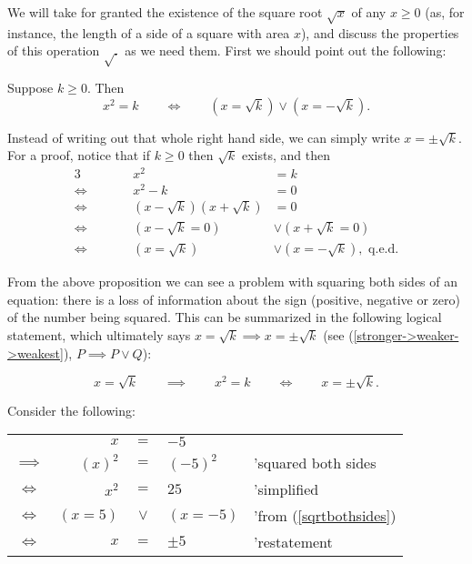 We will take for granted
the existence of the square root $\sqrt{x}$ of any $x\ge0$ (as,
for instance, the length of a side of a square with area $x$), 
and discuss
the properties of this operation $\sqrt{.}$ as we need them.
First we should point out the following:
\begin{principle}
Suppose $k\ge0$.  Then
\begin{equation} x^2=k\qquad \iff\qquad \left(x=\sqrt{k}\right)
\vee\left(x=-\sqrt{k}\right).\end{equation}
\end{principle}
Instead of writing out that whole right hand side, we can 
simply write $x=\pm\sqrt{k}$.  
For a proof, notice that if $k\ge0$ then $\sqrt{k}$ exists, and then
\begin{alignat*}{3}
&&x^2&=k\\
\iff&\qquad&x^2-k&=0\\
\iff&&\left(x-\sqrt{k}\right)\left(x+\sqrt{k}\right)&=0\\
\iff&&\left(x-\sqrt{k}=0\right)&\vee\left(x+\sqrt{k}=0\right)\\
\iff&&\left(x=\sqrt{k}\right)&\vee\left(x=-\sqrt{k}\right),
\text{ q.e.d.}
\end{alignat*}



From the above proposition we can 
see a problem with squaring both sides
of an equation: there is a loss of information about the sign
(positive, negative or zero)
of the number being squared.  This can be summarized in the
following logical statement, which 
ultimately says $x=\sqrt{k}\implies x=\pm\sqrt{k}$
(see (\ref{stronger->weaker->weakest}), $P\implies P\vee Q$):

\begin{equation}
x=\sqrt{k}\qquad\implies\qquad x^2=k\qquad\iff 
\qquad x=\pm\sqrt{k}.\label{sqrtbothsides}\end{equation} 



\bex
Consider the following:

\begin{tabular}{crcll}
&\qquad\qquad$x$ &$=$&$-5$&\\
$\implies$&$(x)^2$&$=$&$(-5)^2$&'squared both sides\\
$\iff$&$x^2$&$=$&$25$&'simplified\\
$\iff$&$(x=5)$&$\vee$&$(x=-5)$&'from (\ref{sqrtbothsides})\\
$\iff$&$x$&$=$&$\pm5$&'restatement 
\end{tabular}  

